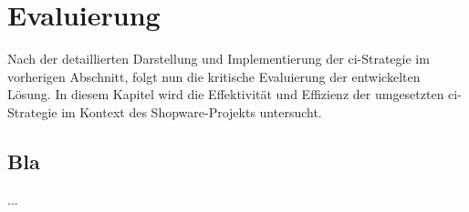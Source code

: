 
\section{Evaluierung} \label{sec:05-evaluation}


Nach der detaillierten Darstellung und Implementierung der \acrshort{ci}-Strategie im vorherigen Abschnitt, folgt nun
die kritische Evaluierung der entwickelten Lösung.
In diesem Kapitel wird die Effektivität und Effizienz der umgesetzten \acrshort{ci}-Strategie im Kontext des
Shopware-Projekts untersucht.

\subsection{Bla} \label{subsec:05-evaluation-1}

...

\clearpage
